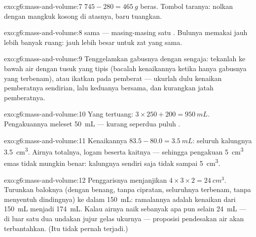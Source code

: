 \begin{solution}{exo:g6:mass-and-volume:7}
$745 - 280 = \qty{465}{g}$ beras. Tombol taranya: nolkan 
dengan mangkuk kosong di atasnya, baru tuangkan.
\end{solution}

\begin{solution}{exo:g6:mass-and-volume:8}
 sama --- masing-masing satu . Bulunya memakai jauh
lebih banyak ruang:  jauh lebih besar untuk zat yang sama.
\end{solution}

\begin{solution}{exo:g6:mass-and-volume:9}
Tenggelamkan gabusnya dengan sengaja: tekanlah ke bawah air dengan
tusuk yang tipis (bacalah kenaikannya ketika hanya gabusnya yang
terbenam), atau ikatkan pada pemberat --- ukurlah dulu kenaikan
pemberatnya sendirian, lalu keduanya bersama, dan kurangkan jatah
pemberatnya.
\end{solution}

\begin{solution}{exo:g6:mass-and-volume:10}
Yang tertuang: $3 \times 250 + 200 = \qty{950}{mL}$. Pengakuannya
meleset \qty{50}{mL} --- kurang seperdua puluh .
\end{solution}

\begin{solution}{exo:g6:mass-and-volume:11}
Kenaikannya $83.5 - 80.0 = \qty{3.5}{mL}$: seluruh  kalungnya
\qty{3.5}{cm^3}. Airnya   totalnya, logam beserta
kaitnya --- sehingga pengakuan \qty{5}{cm^3} emas tidak mungkin benar:
kalungnya sendiri saja tidak sampai \qty{5}{cm^3}.
\end{solution}

\begin{solution}{exo:g6:mass-and-volume:12}
Penggarisnya menjanjikan $4 \times 3 \times 2 = \qty{24}{cm^3}$.
Turunkan baloknya (dengan benang, tanpa cipratan, seluruhnya terbenam,
tanpa menyentuh dindingnya) ke dalam \qty{150}{mL}: ramalannya adalah
kenaikan dari \qty{150}{mL} menjadi \qty{174}{mL}. Kalau airnya naik
sebanyak apa pun selain \qty{24}{mL} --- di luar satu dua undakan
jujur gelas ukurnya --- proposisi pendesakan air akan terbantahkan.
(Itu tidak pernah terjadi.)
\end{solution}

